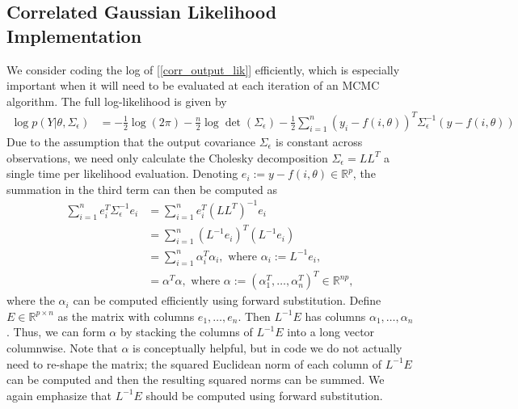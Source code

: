 \documentclass[12pt]{article}
\newcommand{\R}{\mathbb{R}}
\begin{document}
\subsection{Correlated Gaussian Likelihood Implementation} \label{corr_output_lik_implementation}
We consider coding the log of [\ref{corr_output_lik}] efficiently, which is especially important when it will need to be evaluated at each iteration of an
MCMC algorithm. The full log-likelihood is given by 
\begin{align}
\log p(Y|\theta, \Sigma_\epsilon) &= -\frac{1}{2} \log(2\pi) -\frac{n}{2} \log \det(\Sigma_\epsilon) - \frac{1}{2} \sum_{i = 1}^{n} (y_i - f(i, \theta))^T \Sigma_\epsilon^{-1} (y - f(i, \theta)) \label{log_lik_corr_outputs}
\end{align}
Due to the assumption that the output covariance $\Sigma_\epsilon$ is constant across observations, we need only calculate the Cholesky decomposition 
$\Sigma_\epsilon = LL^T$ a single time per likelihood evaluation. Denoting $e_i := y - f(i, \theta) \in \R^p$, the summation in the third term can then be computed as
\begin{align}
\sum_{i = 1}^{n} e_i^T \Sigma_\epsilon^{-1} e_i &= \sum_{i = 1}^{n} e_i^T (L L^T)^{-1} e_i \\
									&= \sum_{i = 1}^{n} (L^{-1} e_i)^T (L^{-1} e_i) \nonumber \\
									&=  \sum_{i = 1}^{n} \alpha_i^T \alpha_i, \text{ where } \alpha_i := L^{-1}e_i, \nonumber \\
									&= \alpha^T \alpha, \text{ where } \alpha := (\alpha_1^T, \dots, \alpha_n^T)^T \in \R^{np}, \nonumber
\end{align}
where the $\alpha_i$ can be computed efficiently using forward substitution. Define $E \in \R^{p \times n}$ as the matrix with columns $e_1, \dots, e_n$. 
Then $L^{-1}E$ has columns $\alpha_1, \dots, \alpha_n$. Thus, we can form $\alpha$ by stacking the columns of $L^{-1}E$ into a long vector 
columnwise. Note that $\alpha$ is conceptually helpful, but in code we do not actually need to re-shape the matrix; the squared Euclidean norm of each column 
of $L^{-1}E$ can be computed and then the resulting squared norms can be summed. We again emphasize that $L^{-1}E$ should be computed using forward 
substitution. 
\end{document}
